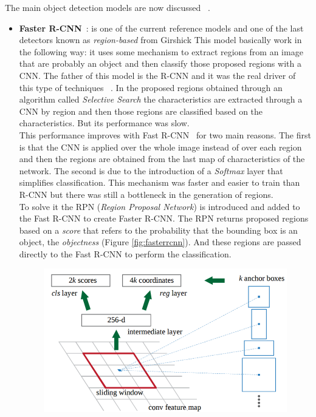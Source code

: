 The main object detection models are now discussed ~\cite{fu2017dssd}.
\begin{itemize}
    \item \textbf{Faster R-CNN}~\cite{ren2015faster}: is one of the current reference models and one of the last detectors known as  \textit{region-based} from Girshick \etal{}This model basically work in the following way: it uses some mechanism to extract regions from an image that are probably an object and then classify those proposed regions with a CNN. The father of this model is the R-CNN and it was the real driver of this type of techniques ~\cite{girshick2014rich}. In the proposed regions obtained through an algorithm called \textit{Selective Search} the characteristics are extracted through a CNN by region and then those regions are classified based on the characteristics. But its performance was slow.\\
    This performance improves with Fast R-CNN~\cite{girshick2015fast} for two main reasons. The first is that the CNN is applied over the whole image instead of over each region and then the regions are obtained from the last map of characteristics of the network. The second is due to the introduction of a \textit{Softmax} layer that simplifies classification. This mechanism was faster and easier to train than R-CNN but there was still a bottleneck in the generation of regions.\\
    To solve it the RPN (\textit{Region Proposal Network}) is introduced and added to the Fast R-CNN to create Faster R-CNN. The RPN returns proposed regions based on a \textit{score} that refers to the probability that the bounding box is an object, the \textit{objectness} (Figure \ref{fig:fasterrcnn}). And these regions are passed directly to the Fast R-CNN to perform the classification.\\
    \begin{figure}[H]
    \begin{center}
    \includegraphics[scale=0.3]{previous_version/faster_rcnn.png}

\end{center}
\end{figure}
\end{itemize}
